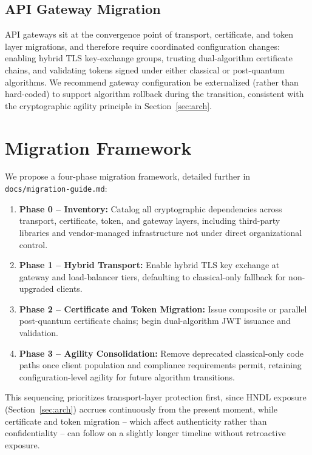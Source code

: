 \documentclass[conference]{IEEEtran}
\begin{document}
\subsection{API Gateway Migration}

API gateways sit at the convergence point of transport, certificate, and
token layer migrations, and therefore require coordinated configuration
changes: enabling hybrid TLS key-exchange groups, trusting dual-algorithm
certificate chains, and validating tokens signed under either classical or
post-quantum algorithms. We recommend gateway configuration be
externalized (rather than hard-coded) to support algorithm rollback during
the transition, consistent with the cryptographic agility principle in
Section~\ref{sec:arch}.

\section{Migration Framework}

We propose a four-phase migration framework, detailed further in
\texttt{docs/migration-guide.md}:

\begin{enumerate}
  \item \textbf{Phase 0 -- Inventory:} Catalog all cryptographic
        dependencies across transport, certificate, token, and gateway
        layers, including third-party libraries and vendor-managed
        infrastructure not under direct organizational control.
  \item \textbf{Phase 1 -- Hybrid Transport:} Enable hybrid TLS key
        exchange at gateway and load-balancer tiers, defaulting to
        classical-only fallback for non-upgraded clients.
  \item \textbf{Phase 2 -- Certificate and Token Migration:} Issue
        composite or parallel post-quantum certificate chains; begin
        dual-algorithm JWT issuance and validation.
  \item \textbf{Phase 3 -- Agility Consolidation:} Remove deprecated
        classical-only code paths once client population and compliance
        requirements permit, retaining configuration-level agility for
        future algorithm transitions.
\end{enumerate}

This sequencing prioritizes transport-layer protection first, since
HNDL exposure (Section~\ref{sec:arch}) accrues continuously from the
present moment, while certificate and token migration -- which affect
authenticity rather than confidentiality -- can follow on a slightly
longer timeline without retroactive exposure.
\end{document}
